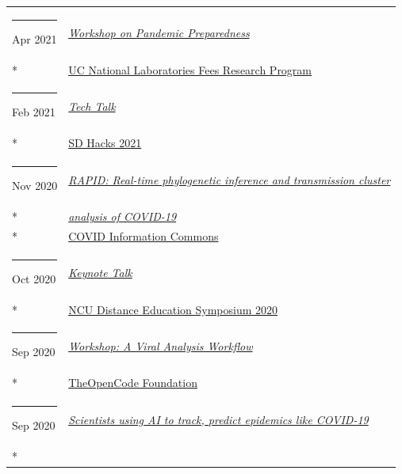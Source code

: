 \documentclass[margin,line]{res}
\begin{document}
\begin{resume}
\begin{longtable}{@{}p{0.7in}p{4in}}
\hspace*{-4mm} \rule{-1mm}{5mm} Apr 2021 & \href{https://www.ucop.edu/research-initiatives/programs/lab-fees/workshops.html}{\textit{Workshop on Pandemic Preparedness}}\\*
\hspace*{-4mm} & \hspace{4mm} \href{https://www.ucop.edu/research-initiatives/programs/lab-fees/index.html}{UC National Laboratories Fees Research Program}\\
\hspace*{-4mm} \rule{-1mm}{5mm} Feb 2021 & \href{https://www.sdhacks.io/}{\textit{Tech Talk}}\\*
\hspace*{-4mm} & \hspace{4mm} \href{https://www.sdhacks.io/}{SD Hacks 2021}\\
\hspace*{-4mm} \rule{-1mm}{5mm} Nov 2020 & \href{https://www.youtube.com/watch?v=6-fDbTY8ySI}{\textit{RAPID: Real-time phylogenetic inference and transmission cluster}}\\*
\hspace*{-4mm} & \hspace{4mm} \href{https://www.youtube.com/watch?v=6-fDbTY8ySI}{\textit{analysis of COVID-19}}\\*
\hspace*{-4mm} & \hspace{4mm} \href{https://covidinfocommons.datascience.columbia.edu/}{COVID Information Commons}\\
\hspace*{-4mm} \rule{-1mm}{5mm} Oct 2020 & \href{http://distance.ncu.edu.jm/proposal_submission}{\textit{Keynote Talk}}\\*
\hspace*{-4mm} & \hspace{4mm} \href{http://distance.ncu.edu.jm/proposal_submission}{NCU Distance Education Symposium 2020}\\
\hspace*{-4mm} \rule{-1mm}{5mm} Sep 2020 & \href{https://www.theopencode.org/a-viral-analysis-workflow/}{\textit{Workshop: A Viral Analysis Workflow}}\\*
\hspace*{-4mm} & \hspace{4mm} \href{https://www.theopencode.org/}{TheOpenCode Foundation}\\
\hspace*{-4mm} \rule{-1mm}{5mm} Sep 2020 & \href{https://youtu.be/xHSFWtLL8bc}{\textit{Scientists using AI to track, predict epidemics like COVID-19}}\\*

\end{longtable}
\end{resume}
\end{document}
